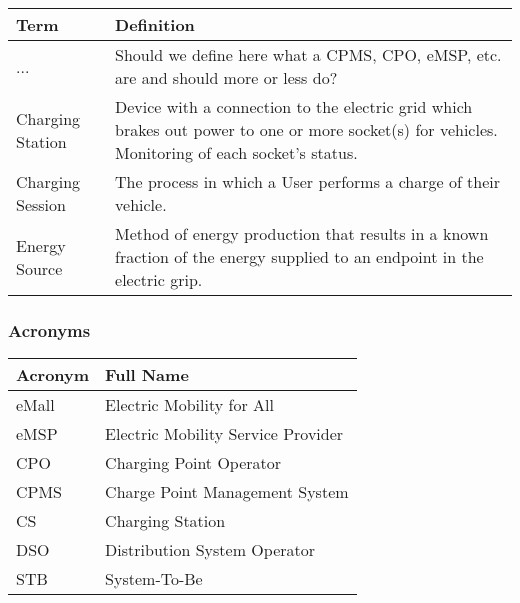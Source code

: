 \documentclass[11pt]{article}
\begin{document}
\begin{table}[H]
    \centering
    \setlength{\tabcolsep}{18pt}
    \renewcommand{\arraystretch}{1.2}
    \begin{tabularx}{\textwidth}{|>{\centering\hsize=0.3\hsize}X|>{\hsize=1.7\hsize}X|}
        \hline
        \textbf{Term} & \textbf{Definition} \\
        \hline
        ... & Should we define here what a CPMS, CPO, eMSP, etc. are and should more or less do? \\
        \hline
        Charging Station & Device with a connection to the electric grid which brakes out power to one or more socket(s) for vehicles. Monitoring of each socket's status. \\
        \hline
        Charging Session & The process in which a User performs a charge of their vehicle. \\
        \hline
        Energy Source & Method of energy production that results in a known fraction of the energy supplied to an endpoint in the electric grip. \\
        \hline
    \end{tabularx}
    \label{tab:definitions}
\end{table}

\subsubsection{Acronyms}

\begin{table}[H]
    \centering
    \setlength{\tabcolsep}{18pt}
    \renewcommand{\arraystretch}{1.2}
    \begin{tabularx}{\textwidth}{|>{\centering\hsize=0.3\hsize}X|>{\hsize=1.7\hsize}X|}
        \hline
        \textbf{Acronym} & \textbf{Full Name} \\
        \hline
        eMall & Electric Mobility for All \\
        \hline
        eMSP & Electric Mobility Service Provider \\
        \hline
        CPO & Charging Point Operator \\
        \hline
        CPMS & Charge Point Management System \\
        \hline
        CS & Charging Station \\
        \hline
        DSO & Distribution System Operator \\
        \hline
        STB & System-To-Be \\
        \hline
    \end{tabularx}
    \label{tab:acronyms}
\end{table}
\end{document}
